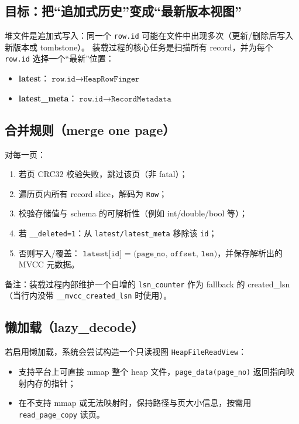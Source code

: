 \subsection{目标：把“追加式历史”变成“最新版本视图”}

堆文件是追加式写入：同一个 \texttt{row.id} 可能在文件中出现多次（更新/删除后写入新版本或 tombstone）。
装载过程的核心任务是扫描所有 record，并为每个 \texttt{row.id} 选择一个“最新”位置：

\begin{itemize}
  \item \textbf{latest}：\(\texttt{row.id} \rightarrow \texttt{HeapRowFinger}\)
  \item \textbf{latest\_meta}：\(\texttt{row.id} \rightarrow \texttt{RecordMetadata}\)
\end{itemize}

\subsection{合并规则（merge one page）}

对每一页：

\begin{enumerate}
  \item 若页 CRC32 校验失败，跳过该页（非 fatal）；
  \item 遍历页内所有 record slice，解码为 \texttt{Row}；
  \item 校验存储值与 schema 的可解析性（例如 int/double/bool 等）；
  \item 若 \texttt{\_\_deleted=1}：从 \texttt{latest/latest\_meta} 移除该 \texttt{id}；
  \item 否则写入/覆盖：
    \(\texttt{latest[id] = (page\_no, offset, len)}\)，并保存解析出的 MVCC 元数据。
\end{enumerate}

备注：装载过程内部维护一个自增的 \texttt{lsn\_counter} 作为 fallback 的 created\_lsn（当行内没带 \texttt{\_\_mvcc\_created\_lsn} 时使用）。

\subsection{懒加载（lazy\_decode）}

若启用懒加载，系统会尝试构造一个只读视图 \texttt{HeapFileReadView}：

\begin{itemize}
  \item 支持平台上可直接 mmap 整个 heap 文件，\texttt{page\_data(page\_no)} 返回指向映射内存的指针；
  \item 在不支持 mmap 或无法映射时，保持路径与页大小信息，按需用 \texttt{read\_page\_copy} 读页。
\end{itemize}


